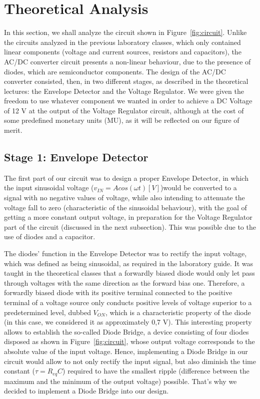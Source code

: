 \section{Theoretical Analysis}
\label{sec:analysis}

In this section, we shall analyze the circuit shown in Figure~\ref{fig:circuit}. Unlike the circuits analyzed in the previous laboratory classes, which only contained linear components (voltage and current sources, resistors and capacitors), the AC/DC converter circuit presents a non-linear behaviour, due to the presence of diodes, which are semiconductor components.
The design of the AC/DC converter consisted, then, in two different stages, as described in the theoretical lectures: the Envelope Detector and the Voltage Regulator. We were given the freedom to use whatever component we wanted in order to achieve a DC Voltage of 12 V at the output of the Voltage Regulator circuit, although at the cost of some predefined monetary units (MU), as it will be reflected on our figure of merit.


\subsection{Stage 1: Envelope Detector}

The first part of our circuit was to design a proper Envelope Detector, in which the input sinusoidal voltage ($v_{IN} = Acos(\omega t) [V]$)would be converted to a signal with no negative values of voltage, while also intending to attenuate the voltage fall to zero (characteristic of the sinusoidal behaviour), with the goal of getting a more constant output voltage, in preparation for the Voltage Regulator part of the circuit (discussed in the next subsection).
This was possible due to the use of diodes and a capacitor.

The diodes' function in the Envelope Detector was to rectify the input voltage, which was defined as being sinusoidal, as required in the laboratory guide. It was taught in the theoretical classes that a forwardly biased diode would only let pass through voltages with the same direction as the forward bias one. Therefore, a forwardly biased diode with its positive terminal connected to the positive terminal of a voltage source only conducts positive levels of voltage superior to a predetermined level, dubbed $V_{ON}$, which is a characteristic property of the diode (in this case, we considered it as approximately 0,7 V). This interesting property allows to establish the so-called Diode Bridge, a device consisting of four diodes disposed as shown in Figure~\ref{fig:circuit}, whose output voltage corresponds to the absolute value of the input voltage. Hence, implementing a Diode Bridge in our circuit would allow to not only rectify the input signal, but also diminish the time constant ($\tau = R_{eq} C$) required to have the smallest ripple (difference between the maximum and the minimum of the output voltage) possible. That's why we decided to implement a Diode Bridge into our design.

